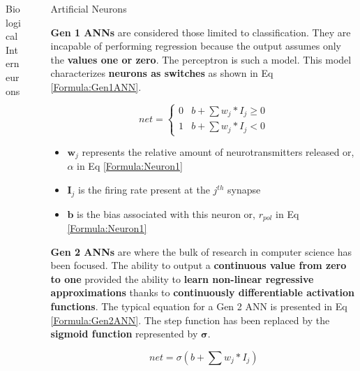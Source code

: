 \documentclass[final]{beamer}
\newlength{\sepwidth}
\newlength{\colwidth}
\newcommand{\separatorcolumn}{\begin{column}{\sepwidth}\end{column}}
\begin{document}
\begin{frame}[t]
\begin{columns}[t]
\begin{column}{\colwidth}
\begin{block}{Biological Interneurons}
  \end{block}

\end{column}

\separatorcolumn

\begin{column}{\colwidth}

  \begin{block}{Artificial Neurons}

    \textbf{Gen 1 ANNs} are considered those limited to classification. They are incapable of performing regression because the output assumes only the \textbf{values one or zero}. The perceptron is such a model. This model characterizes \textbf{neurons as switches} as shown in Eq \ref{Formula:Gen1ANN}.


    \begin{equation}
      \label{Formula:Gen1ANN}
      net = \begin{cases} 
        0 & b + \sum w_{j}*I_{j} \geq 0 \\
        1 & b + \sum w_{j}*I_{j} < 0
        \end{cases}
    \end{equation}

    \begin{itemize}
      \item $\boldsymbol w_{j}$ represents the relative amount of neurotransmitters released or, $\alpha$ in Eq \ref{Formula:Neuron1}
      \item $\boldsymbol I_{j}$ is the firing rate present at the $j^{th}$ synapse 
      \item $\boldsymbol b$ is the bias associated with this neuron or, $r_{pol}$ in Eq \ref{Formula:Neuron1}
    \end{itemize}

    \textbf{Gen 2 ANNs} are where the bulk of research in computer science has been focused. The ability to output a \textbf{continuous value from zero to one} provided the ability to \textbf{learn non-linear regressive approximations} thanks to \textbf{continuously differentiable activation functions}. The typical equation for a Gen 2 ANN is presented in Eq \ref{Formula:Gen2ANN}. The step function has been replaced by the \textbf{sigmoid function} represented by $\boldsymbol \sigma$. 

    \begin{equation}
      \label{Formula:Gen2ANN}
      net = \sigma \left( b + \sum w_{j}*I_{j} \right)
    \end{equation}


\end{block}
\end{column}
\end{columns}
\end{frame}
\end{document}
